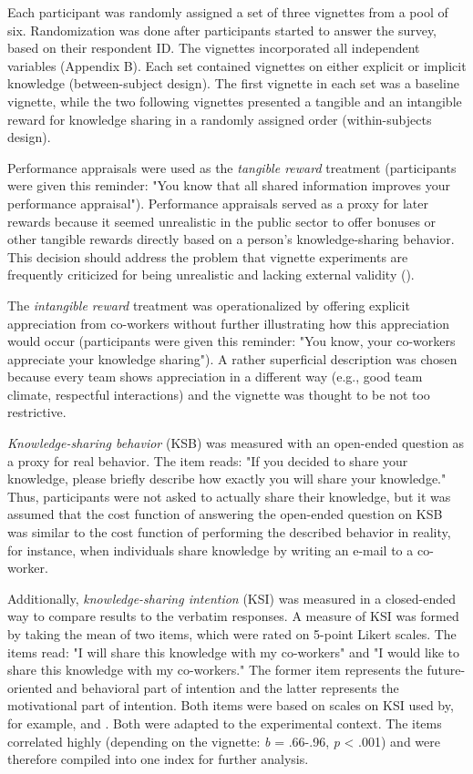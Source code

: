 \documentclass[twocolumn, serif, empirical, authordate]{jote-article}
\begin{document}
Each participant was randomly assigned a set of three vignettes from a pool of six. Randomization was done after participants started to answer the survey, based on their respondent ID. The vignettes incorporated all independent variables (Appendix B). Each set contained vignettes on either explicit or implicit knowledge (between-subject design). The first vignette in each set was a baseline vignette, while the two following vignettes presented a tangible and an intangible reward for knowledge sharing in a randomly assigned order (within-subjects design).

Performance appraisals were used as the \emph{tangible reward} treatment (participants were given this reminder: "You know that all shared information improves your performance appraisal"). Performance appraisals served as a proxy for later rewards because it seemed unrealistic in the public sector to offer bonuses or other tangible rewards directly based on a person's knowledge-sharing behavior. This decision should address the problem that vignette experiments are frequently criticized for being unrealistic and lacking external validity ().

The \emph{intangible reward} treatment was operationalized by offering explicit appreciation from co-workers without further illustrating how this appreciation would occur (participants were given this reminder: "You know, your co-workers appreciate your knowledge sharing"). A rather superficial description was chosen because every team shows appreciation in a different way (e.g., good team climate, respectful interactions) and the vignette was thought to be not too restrictive.

\emph{Knowledge-sharing behavior} (KSB) was measured with an open-ended question as a proxy for real behavior. The item reads: "If you decided to share your knowledge, please briefly describe how exactly you will share your knowledge." Thus, participants were not asked to actually share their knowledge, but it was assumed that the cost function of answering the open-ended question on KSB was similar to the cost function of performing the described behavior in reality, for instance, when individuals share knowledge by writing an e-mail to a co-worker.

Additionally, \emph{knowledge-sharing intention} (KSI) was measured in a closed-ended way to compare results to the verbatim responses. A measure of KSI was formed by taking the mean of two items, which were rated on 5-point Likert scales. The items read: "I will share this knowledge with my co-workers" and "I would like to share this knowledge with my co-workers." The former item represents the future-oriented and behavioral part of intention and the latter represents the motivational part of intention. Both items were based on scales on KSI used by, for example, \textcite{Bock2002} and \textcite{Lin2007}. Both were adapted to the experimental context. The items correlated highly (depending on the vignette: \emph{b} = .66-.96, \emph{p} \textless{} .001) and were therefore compiled into one index for further analysis.
\end{document}

